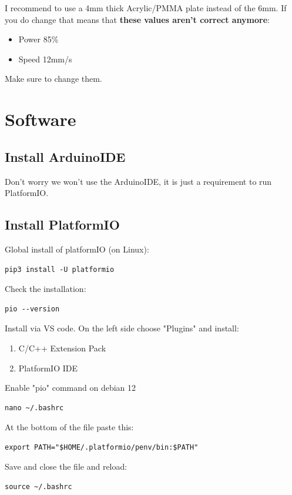 \documentclass[ti,oneside,10pt]{uantwerpenreport}
\newcommand{\RmLstWS}[0]{\vspace{-6pt}} %
\begin{document}
I recommend to use a 4mm thick Acrylic/PMMA plate instead of the 6mm.
If you do change that means that \textbf{these values aren't correct anymore}:
\RmLstWS
\begin{itemize}
    \item Power 85\%
    \item Speed 12mm/s
\end{itemize}
\RmLstWS
Make sure to change them.

\chapter{Software}                  %
\section{Install ArduinoIDE}
Don't worry we won't use the ArduinoIDE, it is just a requirement to run PlatformIO.
\section{Install PlatformIO}
Global install of platformIO (on Linux):
\begin{lstlisting}[style=cmd]
    pip3 install -U platformio
\end{lstlisting}

Check the installation:
\begin{lstlisting}[style=cmd]
    pio --version
\end{lstlisting}

Install via VS code.
On the left side choose "Plugins" and install:
\begin{enumerate}[nosep]
    \item C/C++ Extension Pack
    \item PlatformIO IDE
\end{enumerate}

Enable "pio" command on debian 12
\begin{lstlisting}[style=cmd]
    nano ~/.bashrc
\end{lstlisting}

At the bottom of the file paste this:
\begin{lstlisting}[style=script]
    export PATH="$HOME/.platformio/penv/bin:$PATH"
\end{lstlisting}

Save and close the file and reload:
\begin{lstlisting}[style=cmd]
    source ~/.bashrc
\end{lstlisting}
\end{document}
